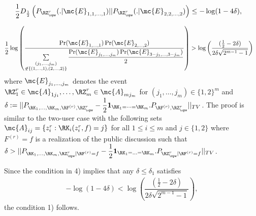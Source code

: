 \begin{align*}
       &\frac{1}{2}D_{\frac{1}{2}} \left(P_{\RZ_{\opw}^r}(.|\mc{E}_{1, 1, \ldots, 1})  
       ||P_{\RZ_{\opw}^r}(.|\mc{E}_{2, 2, \ldots, 2}) \right) \leq -\log(1-4\delta),
 \end{align*}
 
\begin{align*} 
& \frac{1}{2}\log \left(\frac{\Pr(\mc{E}_{1, \ldots, 1})\Pr(\mc{E}_{2, \ldots, 2})}{\sum \limits_{\substack{(j_1,\ldots,j_m)\\ \not\in \{(1,\ldots,1),(2,\ldots,2)\}}}\dfrac{\Pr(\mc{E}_{j_1, \ldots, j_m})\Pr(\mc{E}_{3-j_1,\ldots, 3-j_m})}{2}}\right)>\log\left(\dfrac{(\frac{1}{2}-2\delta)}{2\delta\sqrt{2^{m-1}-1}}\right)
 \end{align*}
 where  $\mc{E}_{j_1, \ldots, j_m}$ denotes the event $\RZ_1^r \in \mc{A}_{1j_1}, \ldots, \RZ_m^r \in \mc{A}_{mj_m}$ for $(j_1,\ldots,j_m) \in \{1, 2\}^m$ and $\delta:=||P_{\RK_1,\ldots, \RK_m,\RF^{(r)},\RZ^r_{\opw}}-\dfrac{1}{2}\mathbf{1}_{\RK_1=\dots=\RK_m}.P_{\RF^{(r)},\RZ^r_{\opw}}||_{TV}$. The proof is similar to the two-user case with the following sets $\mc{A}_{ij}=\{z^r_i:\RK_i(z^r_i,f)=j\}$ for all $1\leq i\leq m$ and $j\in\{1,2\}$ where $F^{(r)}=f$ is a realization of the public discussion such that $\delta>||P_{\RK_1,\ldots, \RK_m,\RZ^r_{\opw}|\RF^{(r)}=f}-\dfrac{1}{2}\mathbf{1}_{\RK_1=\ldots=\RK_m}.P_{\RZ^r_{\opw}|\RF^{(r)}=f}||_{TV}$.
 
 Since the condition in 4) implies that any $\delta \leq \delta_1$ satisfies 
\begin{align*}
    -\log(1-4\delta) < \log\left(\dfrac{(\frac{1}{2}-2\delta)}{2\delta\sqrt{2^{m-1}-1}}\right),
\end{align*}
the condition 1) follows. 


